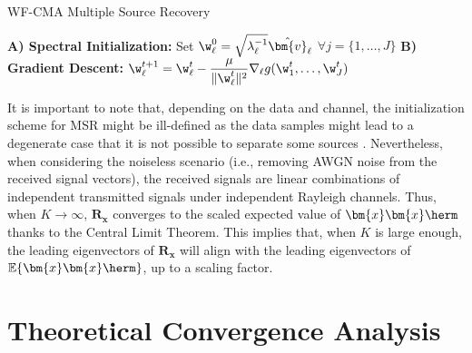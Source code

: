 \begin{algorithm}[H]
\caption{WF-CMA Multiple Source Recovery}
\label{wfcma:alg:wf-msr}
\begin{algorithmic}[1]
	\Statex \textbf{A) Spectral Initialization:}
	\State Set $\w_{\ell}^0=\sqrt{\lambda_{\ell}^{-1}}\hat{\bm{v}}_{\ell}$ $\forall j=\{1,\ldots,J\}$
	\Statex \textbf{B) Gradient Descent:}
	\State $\displaystyle \w_{\ell}^{t+1}=\w_{\ell}^t-\frac{\mu}{\|\w_{\ell}^t\|^2}\nabla_{\ell}g(\w_{1}^t,\ldots,\w_{J}^t)$
	\EndFor
	\EndFor
\end{algorithmic}
\end{algorithm}

It is important to note that, depending on the data and channel, the initialization scheme for MSR might be ill-defined as the data samples might lead to a degenerate case that it is 
not possible to separate some sources \cite{Lu2017spectralinit}. 
Nevertheless, when considering the noiseless scenario (i.e., removing AWGN noise from the received signal vectors), the received signals are linear combinations of independent transmitted signals under independent Rayleigh channels. 
Thus, when $K\rightarrow\infty$, $\bm{R}_{\bm{x}}$ converges to 
the scaled expected value of $\bm{x}\bm{x}\herm$ thanks to the Central Limit Theorem. This implies that, when $K$ is large enough, the leading eigenvectors of $\bm{R}_{\bm{x}}$ will align with the leading eigenvectors of $\mathbb{E}\{\bm{x}\bm{x}\herm\}$, up to  a scaling factor.

\section{Theoretical Convergence Analysis} \label{wfcma:Analysis}

